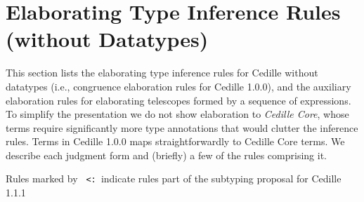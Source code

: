 \documentclass{article}
\newcommand{\les}{\texttt{\,<:\,}}
\begin{document}

\section{Elaborating Type Inference Rules (without Datatypes)}
This section lists the elaborating type inference rules for Cedille without
datatypes (i.e., congruence elaboration rules for Cedille 1.0.0), and the
auxiliary elaboration rules for elaborating telescopes formed by a sequence of
expressions. To simplify the presentation we do not show elaboration to
\textit{Cedille Core}, whose terms require significantly more type annotations
that would clutter the inference rules. Terms in Cedille 1.0.0 maps
straightforwardly to Cedille Core terms. We describe each judgment form and
(briefly) a few of the rules comprising it.

Rules marked by \les indicate rules part of the subtyping proposal for Cedille 1.1.1
\end{document}
